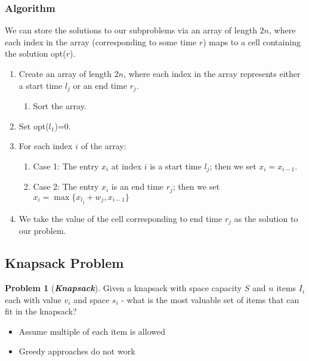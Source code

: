 \documentclass[12pt]{extarticle}
\theoremstyle{definition}
\newtheorem*{problem}{Problem}
\theoremstyle{remark}
\newcommand{\probname}[1]{\noindent \textbf{\textit{#1}}}
\begin{document}
\subsubsection*{Algorithm}
We can store the solutions to our subproblems via an array of length $2n$, where each index in the array (corresponding to some time $r$) maps to a cell containing the solution opt($r$).
\begin{enumerate}
    \item Create an array of length $2n$, where each index in the array represents either a start time $l_j$ or an end time $r_j$. \begin{enumerate}
        \item Sort the array.
    \end{enumerate}
    \item Set opt($l_1$)=0.
    \item For each index $i$ of the array: \begin{enumerate}
        \item Case 1: The entry $x_i$ at index $i$ is a start time $l_j$; then we set $x_i=x_{i-1}$.
        \item Case 2: The entry $x_i$ is an end time $r_j$; then we set $x_i=\max\{x_{l_j}+w_j,x_{i-1}\}$
    \end{enumerate}
    \item We take the value of the cell corresponding to end time $r_j$ as the solution to our problem.
\end{enumerate}

\pagebreak
\subsection{Knapsack Problem}
\begin{problem}[\probname{Knapsack}]
    Given a knapsack with space capacity $S$ and $n$ items $I_i$ each with value $v_i$ and space $s_i$ - what is the most valuable set of items that can fit in the knapsack?\begin{itemize}
        \item Assume multiple of each item is allowed
        \item Greedy approaches do not work
    \end{itemize}
\end{problem}

\vspace{5pt}
\begin{center}
\end{center}
\end{document}
